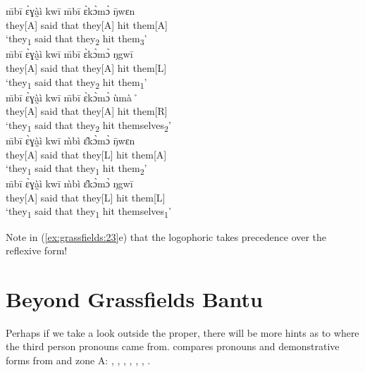 \documentclass[output=paper]{langsci/langscibook}
\begin{document}
 
\ea
    \label{ex:grassfields:23}
  \ea
  \gll  \={m}bī   ɛ̀ɣà̰ì   kwī   \={m}bī   ɛ̀kɔ̀mɔ̀   \={ŋ}wɛn  \\
    they[A]   said   that   they[A]   hit   them[A]   \\
  \glt ‘they\textsubscript{1} said that they\textsubscript{2} hit them\textsubscript{3}’\\
  
  \ex 
  \gll \={m}bī   ɛ̀ɣà̰ì   kwī   \={m}bī   ɛ̀kɔ̀mɔ̀   ŋgwī   \\
    they[A]   said   that   they[A]   hit   them[L]   \\
  \glt ‘they\textsubscript{1} said that they\textsubscript{2} hit them\textsubscript{1}’\\
  
  \ex
  \gll \={m}bī   ɛ̀ɣà̰ì   kwī   \={m}bī   ɛ̀kɔ̀mɔ̀   ùmà˚  \\
    they[A]   said   that   they[A]   hit   them[R]   \\
  \glt ‘they\textsubscript{1} said that they\textsubscript{2} hit themselves\textsubscript{2}’ \\
  
  \ex
  \gll  \={m}bī   ɛ̀ɣà̰ì   kwī   \`{m}bì   ɛ̂kɔ̀mɔ̀   \={ŋ}wɛn \\
    they[A]   said   that   they[L]   hit   them[A]   \\
  \glt  ‘they\textsubscript{1} said that they\textsubscript{1} hit them\textsubscript{2}’\\
  
  \ex
  \gll \={m}bī   ɛ̀ɣà̰ì   kwī   \`{m}bì   ɛ̂kɔ̀mɔ̀   ŋgwī \\
    they[A]   said   that   they[L]   hit   them[L]   \\
  \glt ‘they\textsubscript{1} said that they\textsubscript{1} hit themselves\textsubscript{1}’ \\
  \z
\z

Note in (\ref{ex:grassfields:23}e) that the logophoric takes precedence over the reflexive form!

\section{Beyond Grassfields Bantu}

Perhaps if we take a look outside the  proper, there will be more hints as to where the  third person pronouns came from.  compares pronouns and demonstrative forms from  and  zone A:  \citep{Hyman2003},  \citep{Mous2003},  \citep{Hedinger1980},  \citep{Leroy2007},  \citep{Watters1981},  \citep{Stanley1991},  \citep{Guarisma2000}.
\end{document}
